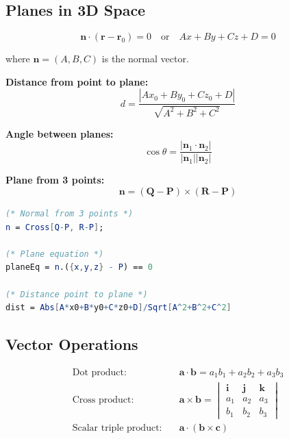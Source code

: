 \documentclass[12pt,a4paper]{article}
\begin{document}
\subsection{Planes in 3D Space}

\begin{definitionbox}
    \[ \mathbf{n} \cdot (\mathbf{r} - \mathbf{r}_0) = 0 \quad \text{or} \quad Ax + By + Cz + D = 0 \]
    
    where \(\mathbf{n} = (A,B,C)\) is the normal vector.
\end{definitionbox}

\begin{formulabox}
    \textbf{Distance from point to plane:}
    \[ d = \frac{|Ax_0 + By_0 + Cz_0 + D|}{\sqrt{A^2 + B^2 + C^2}} \]
    
    \textbf{Angle between planes:}
    \[ \cos\theta = \frac{|\mathbf{n}_1 \cdot \mathbf{n}_2|}{|\mathbf{n}_1||\mathbf{n}_2|} \]
    
    \textbf{Plane from 3 points:}
    \[ \mathbf{n} = (\mathbf{Q}-\mathbf{P}) \times (\mathbf{R}-\mathbf{P}) \]
\end{formulabox}

\begin{mathematicabox}
    \begin{lstlisting}[language=Mathematica, basicstyle=\ttfamily\small]
(* Normal from 3 points *)
n = Cross[Q-P, R-P];

(* Plane equation *)
planeEq = n.({x,y,z} - P) == 0

(* Distance point to plane *)
dist = Abs[A*x0+B*y0+C*z0+D]/Sqrt[A^2+B^2+C^2]
    \end{lstlisting}
\end{mathematicabox}

\subsection{Vector Operations}

\begin{definitionbox}
    \begin{align*}
    \text{Dot product:} &\quad \mathbf{a} \cdot \mathbf{b} = a_1b_1 + a_2b_2 + a_3b_3 \\
    \text{Cross product:} &\quad \mathbf{a} \times \mathbf{b} = \begin{vmatrix}
    \mathbf{i} & \mathbf{j} & \mathbf{k} \\
    a_1 & a_2 & a_3 \\
    b_1 & b_2 & b_3
    \end{vmatrix} \\
    \text{Scalar triple product:} &\quad \mathbf{a} \cdot (\mathbf{b} \times \mathbf{c})
    \end{align*}
\end{definitionbox}
\end{document}
